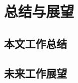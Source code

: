 \chapter{总结与展望}
\label{cha:summary_prospect}

\section{本文工作总结}
\label{sec:summary}

\section{未来工作展望}
\label{sec:prospect}